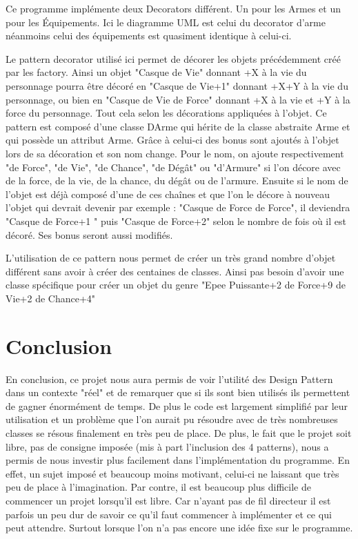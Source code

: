 \documentclass[a4paper]{article}
\begin{document}
Ce programme implémente deux Decorators différent. Un pour les Armes et un pour les Équipements. Ici le diagramme UML est celui du decorator d'arme néanmoins celui des équipements est quasiment identique à celui-ci.

Le pattern decorator utilisé ici permet de décorer les objets précédemment créé par les factory.
Ainsi un objet "Casque de Vie" donnant +X à la vie du personnage pourra être décoré en "Casque de Vie+1" donnant +X+Y à la vie du personnage, ou bien en "Casque de Vie de Force" donnant +X à la vie et +Y à la force du personnage.
Tout cela selon les décorations appliquées à l'objet.
Ce pattern est composé d'une classe DArme qui hérite de la classe abstraite Arme et qui possède un attribut Arme.
Grâce à celui-ci des bonus sont ajoutés à l'objet lors de sa décoration et son nom change.
Pour le nom, on ajoute respectivement "de Force", "de Vie", "de Chance", "de Dégât" ou "d'Armure" si l'on décore avec de la force, de la vie, de la chance, du dégât ou de l'armure.
Ensuite si le nom de l'objet est déjà composé d'une de ces chaînes et que l'on le décore à nouveau l'objet qui devrait devenir par exemple :
"Casque de Force de Force", il deviendra "Casque de Force+1 " puis "Casque de Force+2" selon le nombre de fois où il est décoré.
Ses bonus seront aussi modifiés.

L'utilisation de ce pattern nous permet de créer un très grand nombre d'objet différent sans avoir à créer des centaines de classes. Ainsi pas besoin d'avoir une classe spécifique pour créer un objet du genre "Epee Puissante+2 de Force+9 de Vie+2 de Chance+4"

  \newpage
  \section{Conclusion}

En conclusion, ce projet nous aura permis de voir l'utilité des Design Pattern dans un contexte "réel" et de remarquer que si ils sont bien utilisés ils permettent de gagner énormément de temps. De plus le code est largement simplifié par leur utilisation et un problème que l'on aurait pu résoudre avec de très nombreuses classes se résous finalement en très peu de place.
De plus, le fait que le projet soit libre, pas de consigne imposée (mis à part l’inclusion des 4 patterns), nous a permis de nous investir plus facilement dans l'implémentation du programme.
En effet, un sujet imposé et beaucoup moins motivant, celui-ci ne laissant que très peu de place à l'imagination.
Par contre, il est beaucoup plus difficile de commencer un projet lorsqu'il est libre. Car n'ayant pas de fil directeur il est parfois un peu dur de savoir ce qu'il faut commencer à implémenter et ce qui peut attendre. Surtout lorsque l’on n’a pas encore une idée fixe sur le programme.
\end{document}
